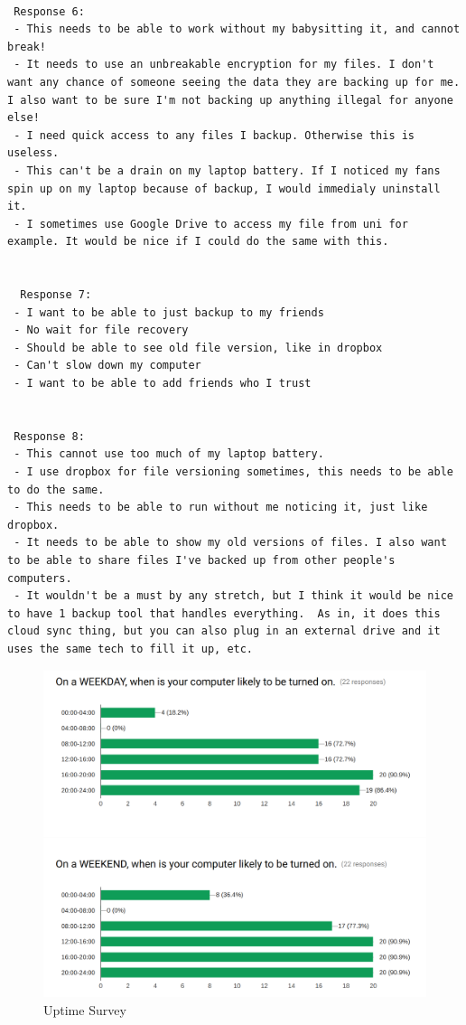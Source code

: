 \documentclass[11pt, a4paper, twocolumn, twoside]{report}
\begin{document}
\begin{lstlisting}[language=RsT, caption=Membrane Feature Survey, label=lst:mbrnsurvey]
  
 Response 6:
 - This needs to be able to work without my babysitting it, and cannot break!
 - It needs to use an unbreakable encryption for my files. I don't want any chance of someone seeing the data they are backing up for me. I also want to be sure I'm not backing up anything illegal for anyone else!
 - I need quick access to any files I backup. Otherwise this is useless.
 - This can't be a drain on my laptop battery. If I noticed my fans spin up on my laptop because of backup, I would immedialy uninstall it.
 - I sometimes use Google Drive to access my file from uni for example. It would be nice if I could do the same with this.
 
 
  Response 7:
 - I want to be able to just backup to my friends
 - No wait for file recovery
 - Should be able to see old file version, like in dropbox
 - Can't slow down my computer
 - I want to be able to add friends who I trust
  
  
 Response 8:
 - This cannot use too much of my laptop battery.
 - I use dropbox for file versioning sometimes, this needs to be able to do the same.
 - This needs to be able to run without me noticing it, just like dropbox.
 - It needs to be able to show my old versions of files. I also want to be able to share files I've backed up from other people's computers.
 - It wouldn't be a must by any stretch, but I think it would be nice to have 1 backup tool that handles everything.  As in, it does this cloud sync thing, but you can also plug in an external drive and it uses the same tech to fill it up, etc.
\end{lstlisting}

\begin{figure}[ht!]
 \centering
 \includegraphics[width=\textwidth]{uptime-survey}
 \caption{Uptime Survey}
 \label{fig:uptime-survey}
\end{figure}
\end{document}
